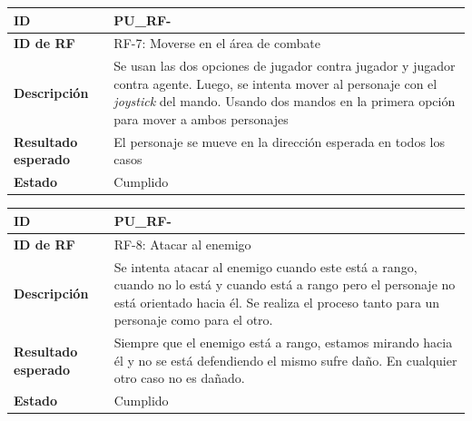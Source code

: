 \begin{center}
	\begin{tabular}{ | p{3cm} | p{10cm} | } 
		\hline
		
		\textbf{ID} & PU\_RF-\arabic{contador_pruebas_funcionales}
		{contador_pruebas_funcionales} \\
		
		\hline 
		\textbf{ID de RF} &
		RF-7: Moverse en el área de combate\\ 
		
		\hline
		\textbf{Descripción} & 
		Se usan las dos opciones de jugador contra jugador y jugador contra agente. Luego, se intenta mover al personaje con el \textit{joystick} del mando. Usando dos mandos en la primera opción para mover a ambos personajes\\
		
		\hline 
		\textbf{Resultado esperado} &
		El personaje se mueve en la dirección esperada en todos los casos\\ 
		
		\hline 
		\textbf{Estado} &
		Cumplido\\ 
		
		\hline
	\end{tabular}
\end{center}

\begin{center}
	\begin{tabular}{ | p{3cm} | p{10cm} | } 
		\hline
		
		\textbf{ID} & PU\_RF-\arabic{contador_pruebas_funcionales}
		{contador_pruebas_funcionales} \\
		
		\hline 
		\textbf{ID de RF} &
		RF-8: Atacar al enemigo\\ 
		
		\hline
		\textbf{Descripción} & 
		Se intenta atacar al enemigo cuando este está a rango, cuando no lo está y cuando está a rango pero el personaje no está orientado hacia él. Se realiza el proceso tanto para un personaje como para el otro.\\
		
		\hline 
		\textbf{Resultado esperado} &
		Siempre que el enemigo está a rango, estamos mirando hacia él y no se está defendiendo el mismo sufre daño. En cualquier otro caso no es dañado.\\ 
		
		\hline 
		\textbf{Estado} &
		Cumplido\\ 
		
		\hline
	\end{tabular}
\end{center}

